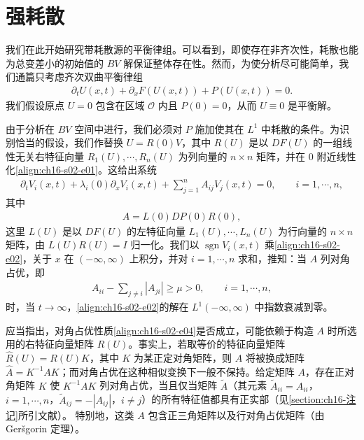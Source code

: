 \documentclass[../../main.tex]{subfiles}
\begin{document}
\section{强耗散}\label{section:ch16-强耗散}

我们在此开始研究带耗散源的平衡律组。可以看到，即使存在非齐次性，耗散也能为总变差小的初始值的 $BV$ 解保证整体存在性。然而，为使分析尽可能简单，我们通篇只考虑齐次双曲平衡律组
\begin{align}
\partial_tU(x,t)+\partial_xF(U(x,t))+P(U(x,t))=0.
\label{align:ch16-s02-e01}
\end{align}
我们假设原点 $U=0$ 包含在区域 $\mathscr{O}$ 内且 $P(0)=0$，从而 $U\equiv0$ 是平衡解。

由于分析在 $BV$ 空间中进行，我们必须对 $P$ 施加使其在 $L^1$ 中耗散的条件。为识别恰当的假设，我们作替换 $U=R(0)V$，其中 $R(U)$ 是以 $DF(U)$ 的一组线性无关右特征向量 $R_1(U),\cdots,R_n(U)$ 为列向量的 $n\times n$ 矩阵，并在 $0$ 附近线性化\eqref{align:ch16-s02-e01}。这给出系统
\begin{align}
\partial_tV_i(x,t)+\lambda_i(0)\partial_xV_i(x,t)+\sum_{j=1}^n A_{ij}V_j(x,t)=0,\qquad i=1,\cdots,n,
\label{align:ch16-s02-e02}
\end{align}
其中
\begin{align}
A=L(0)DP(0)R(0),
\label{align:ch16-s02-e03}
\end{align}
这里 $L(U)$ 是以 $DF(U)$ 的左特征向量 $L_1(U),\cdots,L_n(U)$ 为行向量的 $n\times n$ 矩阵，由 $L(U)R(U)=I$ 归一化。我们以 $\operatorname{sgn}V_i(x,t)$ 乘\eqref{align:ch16-s02-e02}，关于 $x$ 在 $(-\infty,\infty)$ 上积分，并对 $i=1,\cdots,n$ 求和，推知：当 $A$ 列对角占优，即
\begin{align}
A_{ii}-\sum_{j\neq i}|A_{ji}|\geqslant\mu>0,\qquad i=1,\cdots,n,
\label{align:ch16-s02-e04}
\end{align}
时，当 $t\to\infty$，\eqref{align:ch16-s02-e02}的解在 $L^1(-\infty,\infty)$ 中指数衰减到零。

应当指出，对角占优性质\eqref{align:ch16-s02-e04}是否成立，可能依赖于构造 $A$ 时所选用的右特征向量矩阵 $R(U)$。事实上，若取等价的特征向量矩阵 $\hat R(U)=R(U)K$，其中 $K$ 为某正定对角矩阵，则 $A$ 将被换成矩阵 $\hat A=K^{-1}AK$；而对角占优在这种相似变换下一般不保持。给定矩阵 $A$，存在正对角矩阵 $K$ 使 $K^{-1}AK$ 列对角占优，当且仅当矩阵 $\tilde A$（其元素 $\tilde A_{ii}=A_{ii}$，$i=1,\cdots,n$，$\tilde A_{ij}=-|A_{ij}|$，$i\neq j$）的所有特征值都具有正实部（见\cref{section:ch16-注记}所引文献）。
特别地，这类 $A$ 包含正三角矩阵以及行对角占优矩阵（由 Geršgorin 定理）。
\end{document}
